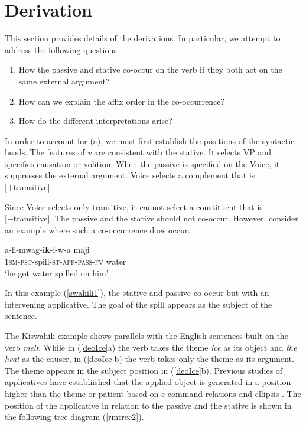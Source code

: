 \documentclass[output=paper]{langscibook}
\begin{document}
\section{Derivation}
This section provides details of the derivations. In particular, we attempt to address the following questions: 

\begin{enumerate}[label=(\alph*)]
    \item How the passive and stative co-occur on the verb if they both act on the same external argument?
    \item How can we explain the affix order in the co-occurrence?
    \item How do the different interpretations arise?
\end{enumerate}

In order to account for (a), we must first establish the positions of the syntactic heads. The features of \textit{v} are consistent with the stative. It selects VP and specifies causation or volition. When the passive is specified on the Voice, it suppresses the external argument. Voice selects a complement that is [+transitive]. 

Since Voice selects only transitive, it cannot select a constituent that is [−trans\-i\-tive]. The passive and the stative should not co-occur. However, consider an example where such a co-occurrence does occur. 

\begin{exe}
\ex\label{swahili1}{
\gll a-li-mwag-\textbf{ik}-i-w-a   maji\\
\textsc{1sm-pst}-spill-\textsc{st-app-pass-fv}  water\\
\glt `he got water spilled on him'}
\end{exe}
In this example (\ref{swahili1}), the stative and passive co-occur but with an intervening applicative. The goal of the spill appears as the subject of the sentence. 

The Kiswahili example shows parallels with the English sentences built on the verb \textit{melt}. While in (\ref{deoIce}a) the verb takes the theme \textit{ice} as its object and \textit{the heat} as the causer, in (\ref{deoIce}b) the verb takes only the theme as its argument. The theme appears in the subject position in (\ref{deoIce}b). Previous studies of applicatives have establiished that the applied object is generated in a position higher than the theme or patient based on c-command relations and ellipsis \citep{Marantz1993,Ngonyani1996,pylkkanen08}. The position of the applicative in relation to the passive and the stative is shown in the following tree diagram (\ref{rmtree2}).
\end{document}
